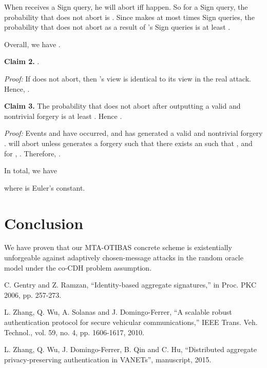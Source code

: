 \documentclass[10pt,journal,compsoc]{IEEEtran}
\begin{document}
When  receives a {\sf Sign} query, he will abort iff
 happen. So for a {\sf Sign} query, the
probability that  does not abort is
. Since  makes at most
 times {\sf Sign} queries, the probability that
  does not abort as a result of 's {\sf Sign} queries is at least .

Overall, we have .

\medskip
\noindent \textbf{Claim 2.} .

\emph{Proof:}
If  does not abort, then 's
view is identical to its view in the real attack. Hence,
.


\medskip\noindent
\textbf{Claim 3.} The probability that  does not abort
after  outputting a valid and nontrivial forgery is at
least . Hence .

\emph{Proof:}
Events  and  have occurred, and 
has generated a valid and nontrivial forgery
.  will
abort unless  generates a forgery such that there
exists an  such that
, and for  , . Therefore, .

\medskip
\indent In total, we have

where  is Euler's constant.



\section{Conclusion}\label{Conclusion}

We have proven that our MTA-OTIBAS concrete scheme is existentially
unforgeable against adaptively chosen-message attacks in
the random oracle model under the co-CDH problem
assumption.


\begin{thebibliography}{99}

 C. Gentry and Z. Ramzan, ``Identity-based aggregate signatures,'' in Proc. PKC 2006, pp. 257-273.






 L. Zhang, Q. Wu, A. Solanas and J. Domingo-Ferrer, ``A scalable robust authentication protocol for secure vehicular communications,'' IEEE Trans. Veh. Technol., vol. 59, no. 4, pp. 1606-1617, 2010.

 L. Zhang, Q. Wu, J. Domingo-Ferrer, B. Qin and
C. Hu, ``Distributed aggregate privacy-preserving authentication
in VANETs'', manuscript, 2015.

\end{thebibliography}
\end{document}
